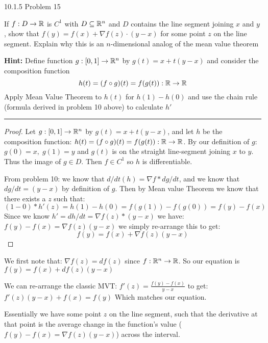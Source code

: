 \documentclass[11pt]{article}
\begin{document}
 10.1.5 Problem 15

If $f: D \to \mathbb{R}$ is $C^1$ with $D \subseteq \mathbb{R}^n$ and $D$ contains the line segment
joining $x$ and $y$, show that $f(y) = f(x) +  \nabla f(z) \cdot (y - x)$ for some
point $z$ on the line segment. Explain why this is an $n$-dimensional
analog of the mean value theorem


\textbf{Hint:} Define function $g : [0, 1] \to \mathbb{R}^n$ by $g(t) = x + t(y - x)$
and consider the composition function 
$$h(t) = (f \circ g)(t) = f(g(t)) : \mathbb{R} \to \mathbb{R}$$
Apply Mean Value Theorem to $h(t)$ for $h(1)- h(0)$ and use the chain rule (formula derived
in problem 10 above) to calculate $h'$
\hrule


\begin{proof}
    
    Let $g : [0, 1] \to \mathbb{R}^n$ by $g(t) = x + t(y - x)$, and let $h$ be the composition
    function: $h(t) = (f \circ g)(t) = f(g(t)) : \mathbb{R} \to \mathbb{R}$.
    By our definition of $g$: $g(0) = x, \; g(1) = y$ and $g(t)$ is on the straight line-segment
    joining $x$ to $y$. Thus the image of $g \in D$. Then $f \in C^1$ so $h$ is differentiable.

    From problem 10: we know that $d/dt (h) = \nabla f * dg/dt$, and we know that $dg/dt = (y-x)$ by definition of $g$.
    Then by Mean value Theorem we know that
    there exists a $z$ such that: $(1-0) * h'(z) = h(1) - h(0) = f(g(1)) - f(g(0)) = f(y) - f(x)$
    Since we know $h' = dh/dt = \nabla f(z) * (y - x)$ we have:
    $f(y) - f(x) = \nabla f(z)(y - x)$ we simply re-arrange this to get:
    $$f(y) = f(x) + \nabla f(z)(y-x)$$
\end{proof}

We first note that:
$\nabla f(z) = df(z)$ since $f: \mathbb{R} ^n \to \mathbb{R}$.
So our equation is $f(y) = f(x) + d f(z)(y-x)$

We can re-arrange the classic MVT: $f'(z) = \frac{f(y) - f(x)}{y - x}$ to get:
$f'(z)(y - x) + f(x) = f(y)$
Which matches our equation. 

Essentially we have some point $z$ on the line segment, such that the derivative at that point
is the average change in the function's value ($f(y) - f(x) = \nabla f(z)(y - x)$) across the interval.
\end{document}
